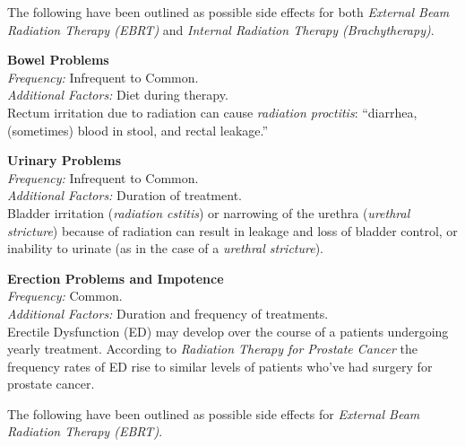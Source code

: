 \documentclass[journal]{vgtc}                %
\begin{document}
                        The following have been outlined as possible side effects for both \textit{External Beam Radiation Therapy (EBRT)} and \textit{Internal Radiation Therapy (Brachytherapy)}.
                        \newline

                        \textbf{Bowel Problems}
                        \\ \textit{Frequency:} Infrequent to Common.
                        \\ \textit{Additional Factors:} Diet during therapy.
                        \\ Rectum irritation due to radiation can cause \textit{radiation proctitis}: ``diarrhea, (sometimes) blood in stool, and rectal leakage.'' \cite{RadiationTherapy:2005}
                        \newline

                        \textbf{Urinary Problems}
                        \\ \textit{Frequency:} Infrequent to Common.
                        \\ \textit{Additional Factors:} Duration of treatment.
                        \\ Bladder irritation (\textit{radiation cstitis}) or narrowing of the urethra (\textit{urethral stricture}) because of radiation can result in leakage and loss of bladder control, or inability to urinate (as in the case of a \textit{urethral stricture}). \cite{RadiationTherapy:2005}
                        \newline

                        \textbf{Erection Problems and Impotence}
                        \\ \textit{Frequency:} Common.
                        \\ \textit{Additional Factors:} Duration and frequency of treatments.
                        \\ Erectile Dysfunction (ED) may develop over the course of a patients undergoing yearly treatment. According to \textit{Radiation Therapy for Prostate Cancer} the frequency rates of ED rise to similar levels of patients who've had surgery for prostate cancer. \cite{RadiationTherapy:2005}
                        \newline

                        The following have been outlined as possible side effects for \textit{External Beam Radiation Therapy (EBRT)}.
                        \newline
\end{document}
